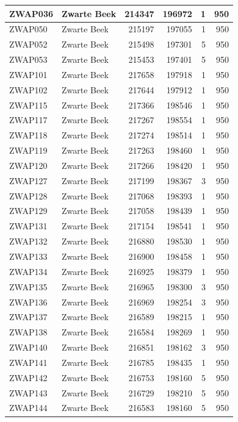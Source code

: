 \documentclass[11pt,]{book}
\begin{document}
\begin{table}
\begin{tabular}[t]{l|l|r|r|r|r}
ZWAP036 & Zwarte Beek & 214347 & 196972 & 1 & 950\\
\hline
ZWAP050 & Zwarte Beek & 215197 & 197055 & 1 & 950\\
\hline
ZWAP052 & Zwarte Beek & 215498 & 197301 & 5 & 950\\
\hline
ZWAP053 & Zwarte Beek & 215453 & 197401 & 5 & 950\\
\hline
ZWAP101 & Zwarte Beek & 217658 & 197918 & 1 & 950\\
\hline
ZWAP102 & Zwarte Beek & 217644 & 197912 & 1 & 950\\
\hline
ZWAP115 & Zwarte Beek & 217366 & 198546 & 1 & 950\\
\hline
ZWAP117 & Zwarte Beek & 217267 & 198554 & 1 & 950\\
\hline
ZWAP118 & Zwarte Beek & 217274 & 198514 & 1 & 950\\
\hline
ZWAP119 & Zwarte Beek & 217263 & 198460 & 1 & 950\\
\hline
ZWAP120 & Zwarte Beek & 217266 & 198420 & 1 & 950\\
\hline
ZWAP127 & Zwarte Beek & 217199 & 198367 & 3 & 950\\
\hline
ZWAP128 & Zwarte Beek & 217068 & 198393 & 1 & 950\\
\hline
ZWAP129 & Zwarte Beek & 217058 & 198439 & 1 & 950\\
\hline
ZWAP131 & Zwarte Beek & 217154 & 198541 & 1 & 950\\
\hline
ZWAP132 & Zwarte Beek & 216880 & 198530 & 1 & 950\\
\hline
ZWAP133 & Zwarte Beek & 216900 & 198458 & 1 & 950\\
\hline
ZWAP134 & Zwarte Beek & 216925 & 198379 & 1 & 950\\
\hline
ZWAP135 & Zwarte Beek & 216965 & 198300 & 3 & 950\\
\hline
ZWAP136 & Zwarte Beek & 216969 & 198254 & 3 & 950\\
\hline
ZWAP137 & Zwarte Beek & 216589 & 198215 & 1 & 950\\
\hline
ZWAP138 & Zwarte Beek & 216584 & 198269 & 1 & 950\\
\hline
ZWAP140 & Zwarte Beek & 216851 & 198162 & 3 & 950\\
\hline
ZWAP141 & Zwarte Beek & 216785 & 198435 & 1 & 950\\
\hline
ZWAP142 & Zwarte Beek & 216753 & 198160 & 5 & 950\\
\hline
ZWAP143 & Zwarte Beek & 216729 & 198210 & 5 & 950\\
\hline
ZWAP144 & Zwarte Beek & 216583 & 198160 & 5 & 950\\

\end{tabular}
\end{table}
\end{document}
